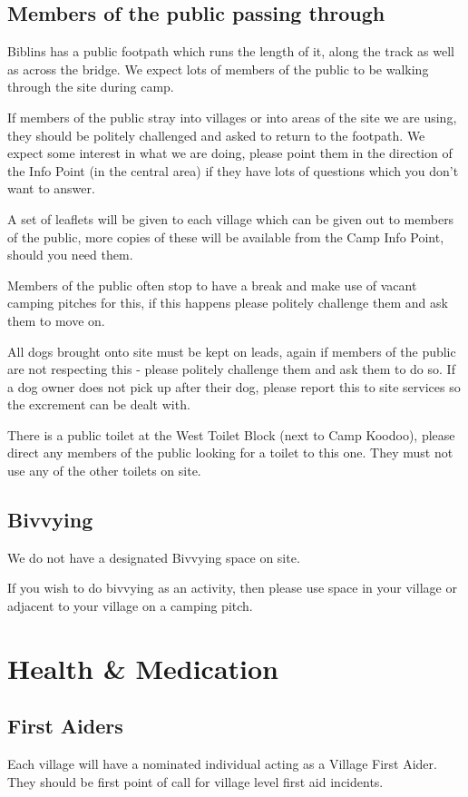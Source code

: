 \documentclass[a4paper, 11pt]{report}
\begin{document}
\section{Members of the public passing through}
Biblins has a public footpath which runs the length of it, along the track as well as across the bridge. We expect lots of members of the public to be walking through the site during camp.\nl

If members of the public stray into villages or into areas of the site we are using, they should be politely challenged and asked to return to the footpath. We expect some interest in what we are doing, please point them in the direction of the Info Point (in the central area) if they have lots of questions which you don't want to answer.\nl

A set of leaflets will be given to each village which can be given out to members of the public, more copies of these will be available from the Camp Info Point, should you need them. \nl

Members of the public often stop to have a break and make use of vacant camping pitches for this, if this happens please politely challenge them and ask them to move on.\nl

All dogs brought onto site must be kept on leads, again if members of the public are not respecting this - please politely challenge them and ask them to do so. If a dog owner does not pick up after their dog, please report this to site services so the excrement can be dealt with. \nl

There is a public toilet at the West Toilet Block (next to Camp Koodoo), please direct any members of the public looking for a toilet to this one. They must not use any of the other toilets on site.

\section{Bivvying}
We do not have a designated Bivvying space on site.\nl

If you wish to do bivvying as an activity, then please use space in your village or adjacent to your village on a camping pitch.

\chapter{Health \& Medication}
\section{First Aiders}
Each village will have a nominated individual acting as a Village First Aider. They should be first point of call for village level first aid incidents.\nl
\end{document}
